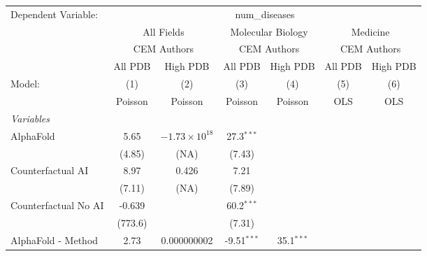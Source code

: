 \begingroup
\centering
\begin{tabular}{lcccccc}
   \tabularnewline \midrule \midrule
   Dependent Variable: & \multicolumn{6}{c}{num\_diseases}\\
 & \multicolumn{2}{c}{All Fields} & \multicolumn{2}{c}{Molecular Biology} & \multicolumn{2}{c}{Medicine} \\
\cmidrule(lr){2-3} \cmidrule(lr){4-5} \cmidrule(lr){6-7}
 & \multicolumn{2}{c}{CEM Authors} & \multicolumn{2}{c}{CEM Authors} & \multicolumn{2}{c}{CEM Authors} \\
\cmidrule(lr){2-3} \cmidrule(lr){4-5} \cmidrule(lr){6-7}
 & \multicolumn{1}{c}{All PDB} & \multicolumn{1}{c}{High PDB} & \multicolumn{1}{c}{All PDB} & \multicolumn{1}{c}{High PDB} & \multicolumn{1}{c}{All PDB} & \multicolumn{1}{c}{High PDB} \\
\cmidrule(lr){2-2} \cmidrule(lr){3-3} \cmidrule(lr){4-4} \cmidrule(lr){5-5} \cmidrule(lr){6-6} \cmidrule(lr){7-7}
   Model:                                                  & (1)       & (2)                    & (3)           & (4)          & (5)  & (6)\\  
                                                           &  Poisson  & Poisson                & Poisson       & Poisson      & OLS  & OLS\\  
   \midrule
   \emph{Variables}\\
   AlphaFold                                               & 5.65      & $-1.73\times 10^{18}$  & 27.3$^{***}$  &              &      &   \\   
                                                           & (4.85)    & (NA)                   & (7.43)        &              &      &   \\   
   Counterfactual AI                                       & 8.97      & 0.426                  & 7.21          &              &      &   \\   
                                                           & (7.11)    & (NA)                   & (7.89)        &              &      &   \\   
   Counterfactual No AI                                    & -0.639    &                        & 60.2$^{***}$  &              &      &   \\   
                                                           & (773.6)   &                        & (7.31)        &              &      &   \\   
   AlphaFold - Method                                      & 2.73      & 0.000000002            & -9.51$^{***}$ & 35.1$^{***}$ &      &   \\   

\end{tabular}
